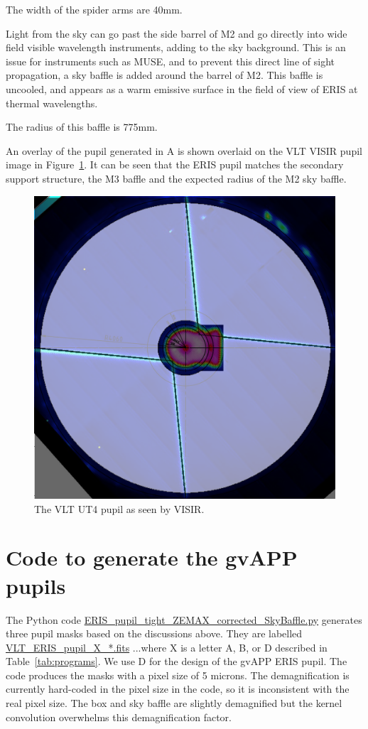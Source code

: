 \documentclass[a4paper,11pt]{article}
\begin{document}
The width of the spider arms are 40mm.

Light from the sky can go past the side barrel of M2 and go directly
into wide field visible wavelength instruments, adding to the sky
background. This is an issue for instruments such as MUSE, and to
prevent this direct line of sight propagation, a sky baffle is added
around the barrel of M2. This baffle is uncooled, and appears as a warm
emissive surface in the field of view of ERIS at thermal wavelengths.

The radius of this baffle is 775mm.

An overlay of the pupil generated in A is shown overlaid on the VLT
VISIR pupil image in Figure~\ref{fig:visir}. It can be seen that the
ERIS pupil matches the secondary support structure, the M3 baffle and
the expected radius of the M2 sky baffle.

\begin{figure}[htp]
\centering
\includegraphics[angle=0,width=0.7\columnwidth]{vlt_visir_pupil}
\caption{ \label{fig:visir} The VLT UT4 pupil as seen by VISIR.}
\end{figure}

\section{Code to generate the gvAPP pupils}

The Python code \url{ERIS_pupil_tight_ZEMAX_corrected_SkyBaffle.py}
generates three pupil masks based on the discussions above. They are
labelled \url{VLT_ERIS_pupil_X_*.fits} ...where X is a letter A, B, or
D described in Table~\ref{tab:programs}. We use D for the design of
the gvAPP ERIS pupil. The code produces the masks with a pixel size of 5
microns. The demagnification is currently hard-coded in the pixel size
in the code, so it is inconsistent with the real pixel size. The box and
sky baffle are slightly demagnified but the kernel convolution
overwhelms this demagnification factor.
\end{document}
